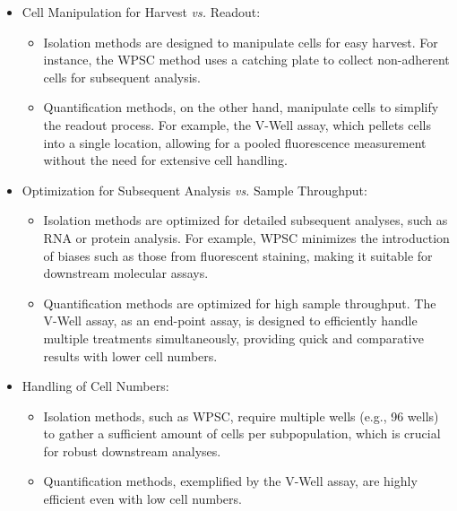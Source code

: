 \begin{itemize}
      \item Cell Manipulation for Harvest \textit{vs.} Readout:
            \begin{itemize}
                  \item Isolation methods are designed to manipulate cells for easy
                        harvest. For instance, the \ac{WPSC} method uses a catching
                        plate to collect non-adherent cells for subsequent analysis.
                  \item Quantification methods, on the other hand, manipulate cells
                        to simplify the readout process. For example, the V-Well
                        assay, which pellets cells into a single location, allowing
                        for a pooled fluorescence measurement without the need for
                        extensive cell handling.
            \end{itemize}

      \item Optimization for Subsequent Analysis \textit{vs.} Sample Throughput:
            \begin{itemize}
                  \item Isolation methods are optimized for detailed subsequent
                        analyses, such as RNA or protein analysis. For example,
                        \ac{WPSC} minimizes the introduction of biases such as those
                        from fluorescent staining, making it suitable for downstream
                        molecular assays.
                  \item Quantification methods are optimized for high sample
                        throughput. The V-Well assay, as an end-point assay, is
                        designed to efficiently handle multiple treatments
                        simultaneously, providing quick and comparative results with
                        lower cell numbers.
            \end{itemize}
      \item Handling of Cell Numbers:
            \begin{itemize}
                  \item Isolation methods, such as \ac{WPSC}, require multiple wells
                        (e.g., 96 wells) to gather a sufficient amount of cells per
                        subpopulation, which is crucial for robust downstream
                        analyses.
                  \item Quantification methods, exemplified by the V-Well assay, are
                        highly efficient even with low cell numbers.
            \end{itemize}
\end{itemize}



